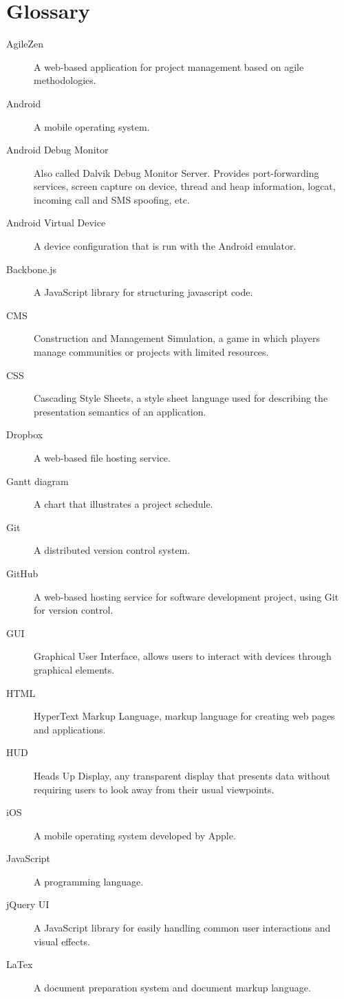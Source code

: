 \chapter{Glossary}


\begin{description}
   \item[AgileZen] A web-based application for project management based on agile methodologies.
   \item[Android] A mobile operating system.
   \item[Android Debug Monitor] Also called Dalvik Debug Monitor Server. Provides port-forwarding services, screen capture on device, thread and heap information, logcat, incoming call and SMS spoofing, etc.
   \item[Android Virtual Device] A device configuration that is run with the Android emulator.
   \item[Backbone.js] A JavaScript library for structuring javascript code.
   \item[CMS] Construction and Management Simulation, a game in which players manage communities or projects with limited resources.
   \item[CSS] Cascading Style Sheets, a style sheet language used for describing the presentation semantics of an application.
   \item[Dropbox] A web-based file hosting service.
   \item[Gantt diagram] A chart that illustrates a project schedule.
   \item[Git] A distributed version control system.
   \item[GitHub] A web-based hosting service for software development project, using Git for version control.
   \item[GUI] Graphical User Interface, allows users to interact with devices through graphical elements.
   \item[HTML] HyperText Markup Language, markup language for creating web pages and applications.
   \item[HUD] Heads Up Display, any transparent display that presents data without requiring users to look away from their usual viewpoints.
   \item[iOS] A mobile operating system developed by Apple.
   \item[JavaScript] A programming language.
   \item[jQuery UI] A JavaScript library for easily handling common user interactions and visual effects.
   \item[LaTex] A document preparation system and document markup language.

\end{description}
